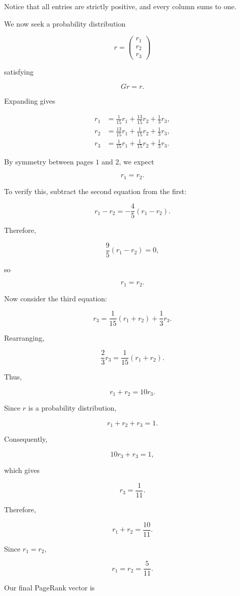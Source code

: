 \documentclass[11pt,a4paper]{article}
\theoremstyle{definition}
\theoremstyle{remark}
\begin{document}
Notice that all entries
are strictly positive,
and every column
sums to one.

We now seek a probability
distribution

\[
r=
\begin{pmatrix}
r_1\\r_2\\r_3
\end{pmatrix}
\]

satisfying

\[
Gr=r.
\]

Expanding gives

\[
\begin{aligned}
r_1
&=
\frac1{15}r_1
+\frac{13}{15}r_2
+\frac13r_3,\\
r_2
&=
\frac{13}{15}r_1
+\frac1{15}r_2
+\frac13r_3,\\
r_3
&=
\frac1{15}r_1
+\frac1{15}r_2
+\frac13r_3.
\end{aligned}
\]

By symmetry between
pages $1$ and $2$,
we expect

\[
r_1=r_2.
\]

To verify this,
subtract the second
equation from the first:

\[
r_1-r_2
=
-\frac45(r_1-r_2).
\]

Therefore,

\[
\frac95(r_1-r_2)=0,
\]

so

\[
r_1=r_2.
\]

Now consider the
third equation:

\[
r_3
=
\frac1{15}(r_1+r_2)
+\frac13r_3.
\]

Rearranging,

\[
\frac23r_3
=
\frac1{15}(r_1+r_2).
\]

Thus,

\[
r_1+r_2=10r_3.
\]

Since $r$ is a
probability distribution,

\[
r_1+r_2+r_3=1.
\]

Consequently,

\[
10r_3+r_3=1,
\]

which gives

\[
r_3=\frac1{11}.
\]

Therefore,

\[
r_1+r_2=\frac{10}{11}.
\]

Since $r_1=r_2$,

\[
r_1=r_2=\frac5{11}.
\]

Our final PageRank
vector is
\end{document}
